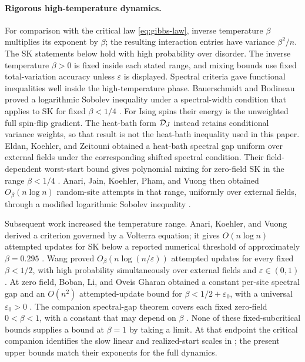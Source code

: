 \paragraph{Rigorous high-temperature dynamics.}
For comparison with the critical law \eqref{eq:gibbs-law}, inverse
temperature $\beta$ multiplies its exponent by $\beta$; the resulting
interaction entries have variance $\beta^2/n$. The SK statements below
hold with high probability over disorder. The inverse temperature
$\beta>0$ is fixed inside each stated range, and
mixing bounds use fixed total-variation accuracy unless $\varepsilon$
is displayed.
Spectral criteria gave functional inequalities well inside the
high-temperature phase. Bauerschmidt and Bodineau proved a logarithmic
Sobolev inequality under a spectral-width condition that applies to SK
for fixed $\beta<1/4$ \cite[Theorem~1 and Corollary~2]{BauerschmidtBodineau2019}.
For Ising spins their energy is the unweighted full spin-flip gradient.
The heat-bath form $\mathcal D_J$ instead retains conditional variance weights,
so that result is not the heat-bath inequality used in this paper.
Eldan, Koehler, and Zeitouni obtained a heat-bath spectral gap uniform
over external fields under the corresponding shifted spectral condition.
Their field-dependent worst-start bound gives polynomial mixing for
zero-field SK in the range $\beta<1/4$
\cite[Theorems~1 and~11, Section~5]{EldanKoehlerZeitouni2022}.
Anari, Jain, Koehler, Pham, and Vuong then obtained
$O_\beta(n\log n)$ random-site attempts in that range, uniformly over
external fields, through a modified logarithmic Sobolev inequality
\cite[Theorem~12]{AnariJainKoehlerPhamVuong2021}.

Subsequent work increased the temperature range. Anari, Koehler, and
Vuong derived a criterion governed by a
Volterra equation; it gives $O(n\log n)$ attempted updates for SK below
a reported numerical threshold of approximately $\beta=0.295$
\cite[Theorem~3 and Section~1.3]{AnariKoehlerVuong2024}.
Wang proved $O_\beta(n\log(n/\varepsilon))$ attempted updates for every
fixed $\beta<1/2$, with high probability simultaneously over external
fields and $\varepsilon\in(0,1)$
\cite[Theorem~1.1]{Wang2026OptimalMixing}.
At zero field, Boban, Li, and Oveis Gharan obtained a constant per-site
spectral gap and an $O(n^2)$ attempted-update bound for
$\beta<1/2+\varepsilon_0$, with a universal $\varepsilon_0>0$
\cite[Theorem~1.5 and Corollary~1.6]{BobanLiOveisGharan2026}.
The companion spectral-gap theorem covers each fixed zero-field
$0<\beta<1$, with a constant that may depend on $\beta$
\cite[Theorem~1.1]{AcceptedGap}. None of these fixed-subcritical bounds
supplies a bound at $\beta=1$ by taking a limit. At that endpoint the
critical companion identifies the slow linear and realized-start scales
in ; the present upper bounds match their
exponents for the full dynamics.

